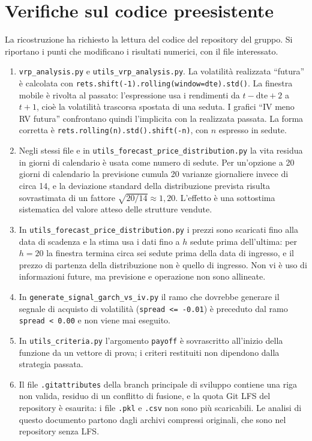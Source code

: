 \documentclass[11pt,a4paper]{article}
\begin{document}
\section{Verifiche sul codice preesistente}\label{sec:codice}

La ricostruzione ha richiesto la lettura del codice del repository del gruppo. Si riportano i punti che modificano i risultati numerici, con il file interessato.

\begin{enumerate}
\item \texttt{vrp\_analysis.py} e \texttt{utils\_vrp\_analysis.py}. La volatilità realizzata ``futura'' è calcolata con \texttt{rets.shift(-1).rolling(window=dte).std()}. La finestra mobile è rivolta al passato: l'espressione usa i rendimenti da $t-\mathrm{dte}+2$ a $t+1$, cioè la volatilità trascorsa spostata di una seduta. I grafici ``IV meno RV futura'' confrontano quindi l'implicita con la realizzata passata. La forma corretta è \texttt{rets.rolling(n).std().shift(-n)}, con $n$ espresso in sedute.
\item Negli stessi file e in \texttt{utils\_forecast\_price\_distribution.py} la vita residua in giorni di calendario è usata come numero di sedute. Per un'opzione a 20 giorni di calendario la previsione cumula 20 varianze giornaliere invece di circa 14, e la deviazione standard della distribuzione prevista risulta sovrastimata di un fattore $\sqrt{20/14}\approx 1{,}20$. L'effetto è una sottostima sistematica del valore atteso delle strutture vendute.
\item In \texttt{utils\_forecast\_price\_distribution.py} i prezzi sono scaricati fino alla data di scadenza e la stima usa i dati fino a $h$ sedute prima dell'ultima: per $h=20$ la finestra termina circa sei sedute prima della data di ingresso, e il prezzo di partenza della distribuzione non è quello di ingresso. Non vi è uso di informazioni future, ma previsione e operazione non sono allineate.
\item In \texttt{generate\_signal\_garch\_vs\_iv.py} il ramo che dovrebbe generare il segnale di acquisto di volatilità (\texttt{spread <= -0.01}) è preceduto dal ramo \texttt{spread < 0.00} e non viene mai eseguito.
\item In \texttt{utils\_criteria.py} l'argomento \texttt{payoff} è sovrascritto all'inizio della funzione da un vettore di prova; i criteri restituiti non dipendono dalla strategia passata.
\item Il file \texttt{.gitattributes} della branch principale di sviluppo contiene una riga non valida, residuo di un conflitto di fusione, e la quota Git LFS del repository è esaurita: i file \texttt{.pkl} e \texttt{.csv} non sono più scaricabili. Le analisi di questo documento partono dagli archivi compressi originali, che sono nel repository senza LFS.
\end{enumerate}
\end{document}
